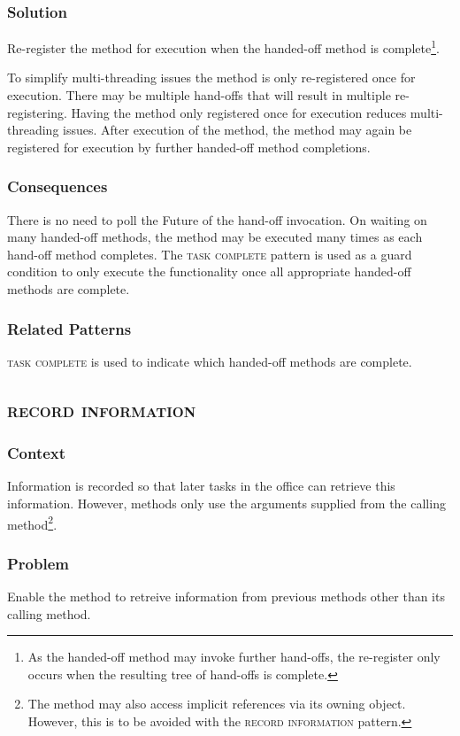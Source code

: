\documentclass[prodmode]{style/acmlarge}
\begin{document}
\subsubsection*{Solution} Re-register the method for execution when the
handed-off method is complete\footnote{As the handed-off method may invoke
further hand-offs, the re-register only occurs when the resulting tree of
hand-offs is complete.}.

To simplify multi-threading issues the method is only re-registered once for
execution.  There may be multiple hand-offs that will result in multiple
re-registering.  Having the method only registered once for execution reduces
multi-threading issues.  After execution of the method, the method may again be
registered for execution by further handed-off method completions.

\subsubsection*{Consequences} There is no need to poll the Future of the
hand-off invocation.  On waiting on many handed-off methods, the method may be
executed many times as each hand-off method completes.  The \textsc{task
complete} pattern is used as a guard condition to only execute the functionality
once all appropriate handed-off methods are complete.

\subsubsection*{Related Patterns} \textsc{task complete} is used to indicate
which handed-off methods are complete.



\subsection{\textsc{\textbf{record information}}}

\subsubsection*{Context} Information is recorded so that later tasks in the
office can retrieve this information.  However, methods only use the arguments
supplied from the calling method\footnote{The method may also access implicit
references via its owning object.  However, this is to be avoided with the
\textsc{record information} pattern.}.

\subsubsection*{Problem} Enable the method to retreive information from previous
methods other than its calling method.
\end{document}
